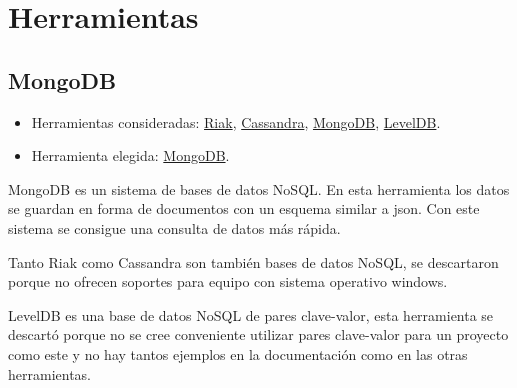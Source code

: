 
\section{Herramientas}

\subsection{MongoDB}

\begin{itemize}
	\tightlist
	\item
	Herramientas consideradas:
	\href{http://basho.com/riak/}{Riak}, 
	\href{http://cassandra.apache.org/}{Cassandra},
	\href{https://www.mongodb.com/}{MongoDB}, 
	\href{http://leveldb.org/}{LevelDB}.
	\item
	Herramienta elegida:
	\href{https://www.mongodb.com/}{MongoDB}.
\end{itemize}

MongoDB es un sistema de bases de datos NoSQL. En esta herramienta los datos se guardan en forma de documentos con un esquema similar a json. Con este sistema se consigue una consulta de datos más rápida.

Tanto Riak como Cassandra son también bases de datos NoSQL, se descartaron porque no ofrecen soportes para equipo con sistema operativo windows. 

LevelDB es una base de datos NoSQL de pares clave-valor, esta herramienta se descartó porque no se cree conveniente utilizar pares clave-valor para un proyecto como este y no hay tantos ejemplos en la documentación como en las otras herramientas.
